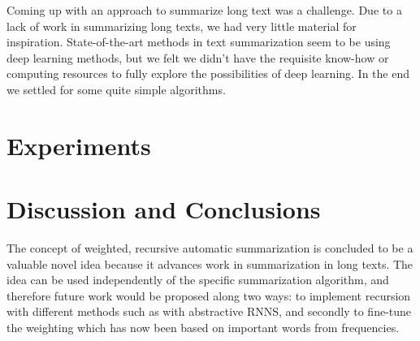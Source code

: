 Coming up with an approach to summarize long text was a challenge. Due to a
lack of work in summarizing long texts, we had very little material for
inspiration. State-of-the-art methods in text summarization seem to be using
deep learning methods, but we felt we didn't have the requisite know-how or
computing resources to fully explore the possibilities of deep learning. 
In the end we settled for some quite simple algorithms.





\section{Experiments}



\section{Discussion and Conclusions} 

The concept of weighted, recursive automatic summarization is concluded to be a valuable novel idea because it advances work in summarization in long texts. The idea can be used independently of the specific summarization algorithm, and therefore future work would be proposed along two ways: to implement recursion with different methods such as with abstractive RNNS, and secondly to fine-tune the weighting which has now been based on important words from frequencies.